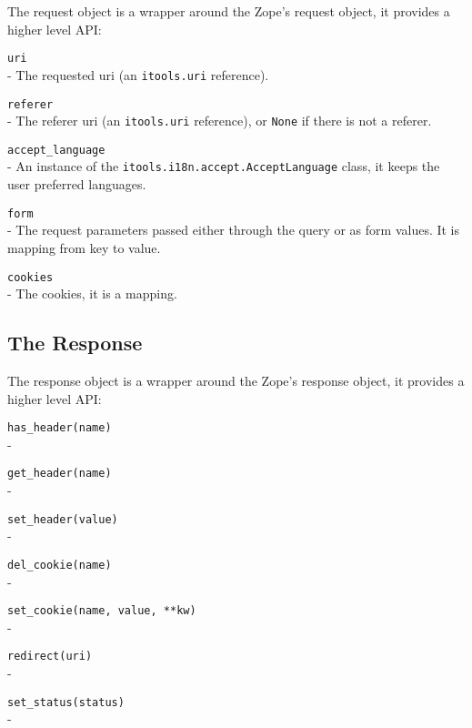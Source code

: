 The request object is a wrapper around the Zope's request object, it
provides a higher level API:

\begin{api}
    {\tt uri}\\
    - The requested uri (an {\tt itools.uri} reference).

    {\tt referer}\\
    - The referer uri (an {\tt itools.uri} reference), or {\tt None} if
      there is not a referer.

    {\tt accept\_language}\\
    - An instance of the {\tt itools.i18n.accept.AcceptLanguage} class, it
      keeps the user preferred languages.

    {\tt form}\\
    - The request parameters passed either through the query or as form
      values. It is mapping from key to value.

    {\tt cookies}\\
    - The cookies, it is a mapping.
\end{api}


\subsection{The Response}

The response object is a wrapper around the Zope's response object, it
provides a higher level API:


\begin{api}
  {\tt has\_header(name)}\\
  - 

  {\tt get\_header(name)}\\
  - 

  {\tt set\_header(value)}\\
  - 

  {\tt del\_cookie(name)}\\
  - 

  {\tt set\_cookie(name, value, **kw)}\\
  - 

  {\tt redirect(uri)}\\
  - 

  {\tt set\_status(status)}\\
  - 
\end{api}